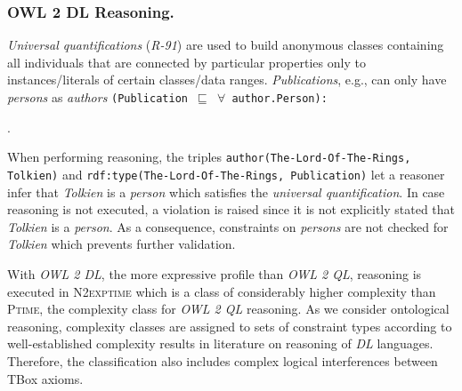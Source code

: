 \documentclass{acm_proc_article-sp}
\newcommand{\ms}[1]{%
  \texttt{#1}
}
\begin{document}
\subsubsection{OWL 2 DL Reasoning.}
{\em Universal quantifications} (\emph{R-91})
are used to build anonymous classes containing all individuals that are connected by particular properties only to instances/literals of certain classes/data ranges.
\emph{Publications}, e.g., can only have \emph{persons} as \emph{authors} {\small\ms{(Publication $\sqsubseteq$ $\forall$ author.Person):}}
\begin{ex}
 .
\end{ex}
When performing reasoning, the triples {\small\ms{author(The-Lord-Of-The-Rings,} \ms{Tolkien)}} and {\small\ms{rdf:type(The-Lord-Of-The-Rings, Publication)}} 
let a reasoner infer that \emph{Tolkien} is a \emph{person} which satisfies the {\em universal quantification}.
In case reasoning is not executed, a violation is raised
since it is not explicitly stated that \emph{Tolkien} is a \emph{person}.
As a consequence, constraints on \emph{persons} are not checked for \emph{Tolkien} which prevents further validation. 

With \emph{OWL 2 DL}, the more expressive profile than \emph{OWL 2 QL}, reasoning is executed in \textsc{N2exptime} \cite{owl2profiles2008} 
which is a class of considerably higher complexity than \textsc{Ptime}, the complexity class for \emph{OWL 2 QL} reasoning.
As we consider ontological reasoning, complexity classes are assigned to sets of constraint types 
according to well-established complexity results in literature on reasoning of \emph{DL} languages.
Therefore, the classification also includes complex logical interferences between TBox axioms.

\end{document}

